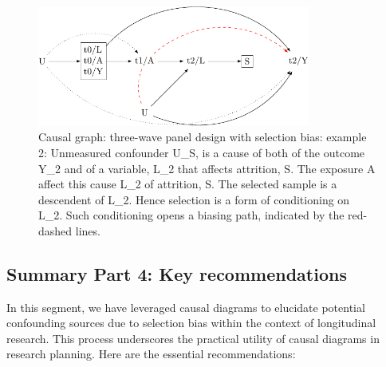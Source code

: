 \documentclass[
  singlecolumn]{report}
\begin{document}
\begin{figure}

{\centering \includegraphics[width=0.8\textwidth,height=\textheight]{causal-dags_files/figure-pdf/fig-dag-8-2-1.pdf}

}

\caption{\label{fig-dag-8-2}Causal graph: three-wave panel design with
selection bias: example 2: Unmeasured confounder U\_S, is a cause of
both of the outcome Y\_2 and of a variable, L\_2 that affects attrition,
S. The exposure A affect this cause L\_2 of attrition, S. The selected
sample is a descendent of L\_2. Hence selection is a form of
conditioning on L\_2. Such conditioning opens a biasing path, indicated
by the red-dashed lines.}

\end{figure}

\hypertarget{summary-part-4-key-recommendations}{%
\subsection{Summary Part 4: Key
recommendations}\label{summary-part-4-key-recommendations}}

In this segment, we have leveraged causal diagrams to elucidate
potential confounding sources due to selection bias within the context
of longitudinal research. This process underscores the practical utility
of causal diagrams in research planning. Here are the essential
recommendations:
\end{document}
